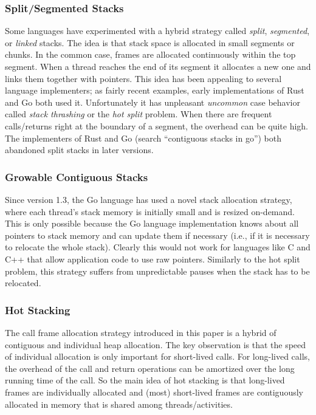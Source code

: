 \documentclass[acmsmall,anonymous,review]{acmart}\settopmatter{printfolios=true,printccs=false,printacmref=false}
\begin{document}
\subsubsection{Split/Segmented Stacks}

Some languages have experimented with a hybrid strategy called \emph{split}, \emph{segmented}, or \emph{linked} stacks.
The idea is that stack space is allocated in small segments or chunks.
In the common case, frames are allocated continuously within the top segment.
When a thread reaches the end of its segment it allocates a new one and links them together with pointers.
This idea has been appealing to several language implementers; as fairly recent examples, early implementations of Rust and Go both used it.
Unfortunately it has unpleasant \emph{uncommon} case behavior called \emph{stack thrashing} or the \emph{hot split} problem.
When there are frequent calls/returns right at the boundary of a segment, the overhead can be quite high.
The implementers of Rust \cite{Anderson2013} and Go (search ``contiguous stacks in go'') both abandoned split stacks in later versions.


\subsubsection{Growable Contiguous Stacks}

Since version 1.3, the Go language has used a novel stack allocation strategy, where each thread's stack memory is initially small and is resized on-demand.
This is only possible because the Go language implementation knows about all pointers to stack memory and can update them if necessary (i.e., if it is necessary to relocate the whole stack).
Clearly this would not work for languages like C and C++ that allow application code to use raw pointers.
Similarly to the hot split problem, this strategy suffers from unpredictable pauses when the stack has to be relocated.

\subsubsection{Hot Stacking}

The call frame allocation strategy introduced in this paper is a hybrid of contiguous and individual heap allocation.
The key observation is that the speed of individual allocation is only important for short-lived calls.
For long-lived calls, the overhead of the call and return operations can be amortized over the long running time of the call.
So the main idea of hot stacking is that long-lived frames are individually allocated and (most) short-lived frames are contiguously allocated in memory that is shared among threads/activities.
\end{document}
